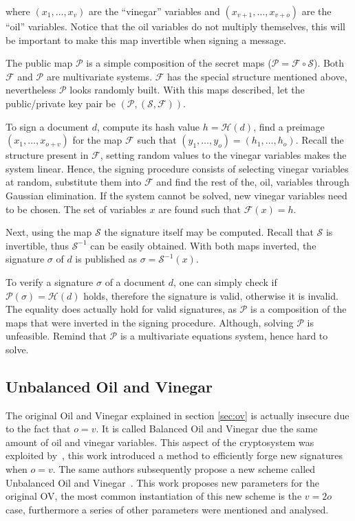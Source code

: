 \documentclass{ufsctex/ufsctex}
\begin{document}
where $(x_1,\dots,x_v)$ are the ``vinegar'' variables and
$(x_{v+1},\dots,x_{v+o})$ are the ``oil'' variables. Notice that the oil
variables do not multiply themselves, this will be important to make this map
invertible when signing a message.

The public map $\mathcal{P}$ is a simple composition of the secret maps
($\mathcal{P} = \mathcal{F} \circ \mathcal{S}$). Both $\mathcal{F}$ and
$\mathcal{P}$ are multivariate systems. $\mathcal{F}$ has the special structure
mentioned above, nevertheless $\mathcal{P}$ looks randomly built. With this
maps described, let the public/private key pair be
$(\mathcal{P},(\mathcal{S},\mathcal{F}))$.

To sign a document $d$, compute its hash value $h = \mathcal{H}(d)$, find a
preimage $(x_1,\dots,x_{o+v})$ for the map $\mathcal{F}$ such that
$(y_1,\dots,y_o) = (h_1,\dots,h_o)$. Recall the structure present in
$\mathcal{F}$, setting random values to the vinegar variables makes the system
linear. Hence, the signing procedure consists of selecting vinegar variables at
random, substitute them into $\mathcal{F}$ and find the rest of the, oil,
variables through Gaussian elimination. If the system cannot be solved, new
vinegar variables need to be chosen. The set of variables $x$ are found such
that $\mathcal{F}(x)=h$.

Next, using the map $\mathcal{S}$ the signature itself may be computed. Recall
that $\mathcal{S}$ is invertible, thus $\mathcal{S}^{-1}$ can be easily
obtained. With both maps inverted, the signature $\sigma$ of $d$ is published
as $\sigma = \mathcal{S}^{-1}(x)$.

To verify a signature $\sigma$ of a document $d$, one can simply check if
$\mathcal{P}(\sigma) = \mathcal{H}(d)$ holds, therefore the signature is valid,
otherwise it is invalid. The equality does actually hold for valid signatures,
as $\mathcal{P}$ is a composition of the maps that were inverted in the signing
procedure. Although, solving $\mathcal{P}$ is unfeasible. Remind that
$\mathcal{P}$ is a multivariate equations system, hence hard to solve.

\subsection{Unbalanced Oil and Vinegar}

The original Oil and Vinegar explained in section \ref{sec:ov} is actually
insecure due to the fact that $o = v$. It is called Balanced Oil and Vinegar
due the same amount of oil and vinegar variables. This aspect of the
cryptosystem was exploited by~\cite{kipnis1998cryptanalysis}, this work
introduced a method to efficiently forge new signatures when $o = v$. The same
authors subsequently propose a new scheme called Unbalanced Oil and
Vinegar~\cite{kipnis1999unbalanced}. This work proposes new parameters for the
original OV, the most common instantiation of this new scheme is the $v = 2o$
case, furthermore a series of other parameters were mentioned and analysed.
\end{document}
